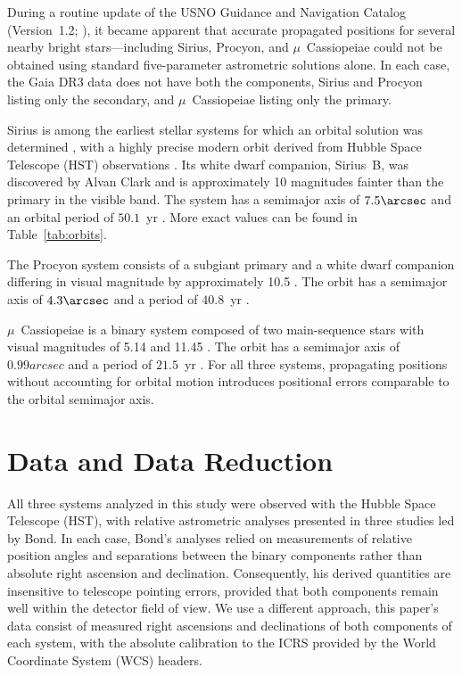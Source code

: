 \documentclass[linenumbers,trackchanges]{aastex701}
\begin{document}
During a routine update of the USNO Guidance and Navigation Catalog (Version~1.2; \citealt{USNOGNC}), it became apparent
that accurate propagated positions for several nearby bright stars—including Sirius, Procyon, and $\mu$~Cassiopeiae
could not be obtained using standard five-parameter astrometric solutions alone. In each case, the Gaia DR3 data does
not have both the components, Sirius and Procyon listing only the secondary, and $\mu$~Cassiopeiae listing only the
primary.

Sirius is among the earliest stellar systems for which an orbital solution was determined
\citep{10.1093/mnras/49.8.420a}, with a highly precise modern orbit derived from Hubble Space Telescope (HST)
observations \citep{2017ApJ...840...70B}. Its white dwarf companion, Sirius~B, was discovered by Alvan Clark
\citep{Clark1862} and is approximately 10 magnitudes fainter than the primary in the visible band. The system has a
semimajor axis of $7.5\arcsec$ and an orbital period of $50.1$~yr
\citep{2017ApJ...840...70B}. More exact values can be found in Table~\ref{tab:orbits}.

The Procyon system \citep{Auwers1862} consists of a subgiant primary and a white dwarf companion differing in visual
magnitude by approximately 10.5 \citep{Wenger2000SIMBAD}. The orbit has a semimajor axis of $4.3\arcsec$
and a period of $40.8$~yr \citep{Bond_2018}. 

$\mu$~Cassiopeiae is a binary system composed of two main-sequence stars with visual magnitudes of 5.14 and 11.45
\citep{Wenger2000SIMBAD}. The orbit has a semimajor axis of $0.99 arcsec$ and a period of $21.5$~yr
\citep{2020ApJ...904..112B}. For all three systems, propagating positions without accounting for orbital 
motion introduces positional errors comparable to the orbital semimajor axis. 

\section{Data and Data Reduction}\label{sec:data_dr}

All three systems analyzed in this study were observed with the Hubble Space Telescope (HST), with relative astrometric
analyses presented in three studies led by Bond. In each case,
Bond's\citep{2015ApJ...813..106B,2017ApJ...840...70B,Bond_2018,2020ApJ...904..112B} analyses relied on measurements of relative
position angles and separations between the binary components rather than absolute right ascension and
declination. Consequently, his derived quantities are insensitive to telescope pointing errors, provided that both
components remain well within the detector field of view. We use a different approach, this paper’s data consist of measured
right ascensions and declinations of both components of each system, with the absolute calibration to the ICRS provided
by the World Coordinate System (WCS)\citep{2002A&A...395.1061G,2002A&A...395.1077C} headers.
\end{document}
